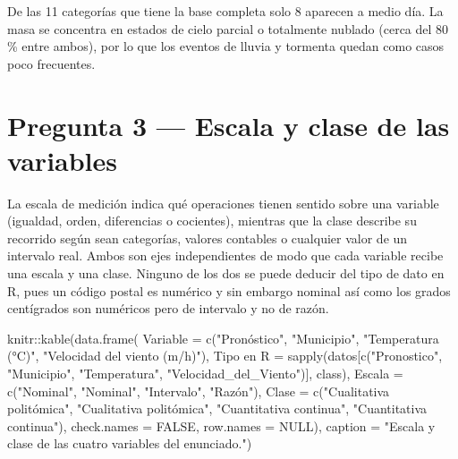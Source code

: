 \documentclass[oneside, openany, fontset=libertinus]{mitthesis}
\newenvironment{Shaded}{\begin{snugshade}}{\end{snugshade}}
\newcommand{\AttributeTok}[1]{\textcolor[rgb]{0.40,0.45,0.13}{#1}}
\newcommand{\ConstantTok}[1]{\textcolor[rgb]{0.56,0.35,0.01}{#1}}
\newcommand{\FunctionTok}[1]{\textcolor[rgb]{0.28,0.35,0.67}{#1}}
\newcommand{\NormalTok}[1]{\textcolor[rgb]{0.00,0.23,0.31}{#1}}
\newcommand{\OtherTok}[1]{\textcolor[rgb]{0.00,0.23,0.31}{#1}}
\newcommand{\SpecialCharTok}[1]{\textcolor[rgb]{0.37,0.37,0.37}{#1}}
\newcommand{\StringTok}[1]{\textcolor[rgb]{0.13,0.47,0.30}{#1}}
\begin{document}
De las 11 categorías que tiene la base completa solo 8 aparecen a medio
día. La masa se concentra en estados de cielo parcial o totalmente
nublado (cerca del 80 \% entre ambos), por lo que los eventos de lluvia
y tormenta quedan como casos poco frecuentes.

\section{Pregunta 3 --- Escala y clase de las variables}\label{p3}

La escala de medición indica qué operaciones tienen sentido sobre una
variable (igualdad, orden, diferencias o cocientes), mientras que la
clase describe su recorrido según sean categorías, valores contables o
cualquier valor de un intervalo real. Ambos son ejes independientes de
modo que cada variable recibe una escala y una clase. Ninguno de los dos
se puede deducir del tipo de dato en R, pues un código postal es
numérico y sin embargo nominal así como los grados centígrados son
numéricos pero de intervalo y no de razón.

\begin{Shaded}
\begin{Highlighting}[]
\NormalTok{knitr}\SpecialCharTok{::}\FunctionTok{kable}\NormalTok{(}\FunctionTok{data.frame}\NormalTok{(}
  \AttributeTok{Variable =} \FunctionTok{c}\NormalTok{(}\StringTok{"Pronóstico"}\NormalTok{, }\StringTok{"Municipio"}\NormalTok{, }\StringTok{"Temperatura (°C)"}\NormalTok{,}
               \StringTok{"Velocidad del viento (m/h)"}\NormalTok{),}
  \StringTok{\textasciigrave{}}\AttributeTok{Tipo en R}\StringTok{\textasciigrave{}} \OtherTok{=} \FunctionTok{sapply}\NormalTok{(datos[}\FunctionTok{c}\NormalTok{(}\StringTok{"Pronostico"}\NormalTok{, }\StringTok{"Municipio"}\NormalTok{,}
                               \StringTok{"Temperatura"}\NormalTok{,}
                               \StringTok{"Velocidad\_del\_Viento"}\NormalTok{)], class),}
  \AttributeTok{Escala =} \FunctionTok{c}\NormalTok{(}\StringTok{"Nominal"}\NormalTok{, }\StringTok{"Nominal"}\NormalTok{, }\StringTok{"Intervalo"}\NormalTok{, }\StringTok{"Razón"}\NormalTok{),}
  \AttributeTok{Clase =} \FunctionTok{c}\NormalTok{(}\StringTok{"Cualitativa politómica"}\NormalTok{, }\StringTok{"Cualitativa politómica"}\NormalTok{,}
            \StringTok{"Cuantitativa continua"}\NormalTok{, }\StringTok{"Cuantitativa continua"}\NormalTok{),}
  \AttributeTok{check.names =} \ConstantTok{FALSE}\NormalTok{, }\AttributeTok{row.names =} \ConstantTok{NULL}\NormalTok{),}
  \AttributeTok{caption =} \StringTok{"Escala y clase de las cuatro variables del enunciado."}\NormalTok{)}
\end{Highlighting}
\end{Shaded}
\end{document}
